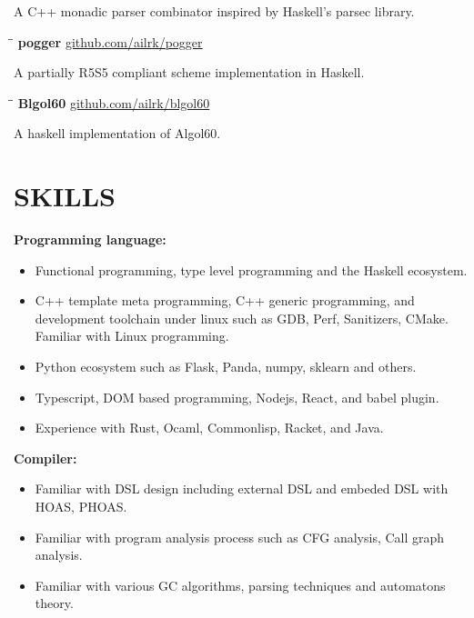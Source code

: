 \documentclass{resume}
\begin{document}
    \vspace{-0.3in}
    A C++ monadic parser combinator inspired by Haskell's parsec library.
    \vspace{-0.1in}

    \begin{tabbing}
        \hspace{2.4in}\= \hspace{0.9in}\= \kill
        {\bf pogger } \>               \>\url{github.com/ailrk/pogger}\\

    \end{tabbing}
    \vspace{-0.3in}
    A partially R5S5 compliant scheme implementation in Haskell.
    \vspace{-0.1in}

    \begin{tabbing}
        \hspace{2.4in}\= \hspace{0.9in}\= \kill
        {\bf Blgol60 } \>               \>\url{github.com/ailrk/blgol60}\\

    \end{tabbing}
    \vspace{-0.3in}
    A haskell implementation of Algol60.
    \vspace{-0.1in}


\section{SKILLS}

    \textbf{Programming language: }
    \begin{itemize}
        \item Functional programming, type level programming and the Haskell ecosystem.
        \item C++ template meta programming, C++ generic programming, and development toolchain under linux such as GDB, Perf, Sanitizers, CMake. Familiar with Linux programming.
        \item Python ecosystem such as Flask, Panda, numpy, sklearn and others.
        \item Typescript, DOM based programming, Nodejs, React, and babel plugin.
        \item Experience with Rust, Ocaml, Commonlisp, Racket, and Java.
    \end{itemize}

    \textbf{Compiler: }
    \begin{itemize}
        \item Familiar with DSL design including external DSL and embeded DSL with HOAS, PHOAS.
        \item Familiar with program analysis process such as CFG analysis, Call graph analysis.
        \item Familiar with various GC algorithms, parsing techniques and automatons theory.
    \end{itemize}
\end{document}
